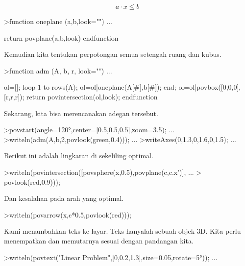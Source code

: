 \documentclass[12pt,arial,letterpaper]{book}
\begin{document}
\begin{eulercomment}
\begin{eulercomment}
\begin{eulercomment}
\begin{eulercomment}
\begin{eulercomment}
\begin{eulercomment}
\begin{eulercomment}
\begin{eulercomment}
\begin{eulercomment}
\begin{eulercomment}
\begin{eulercomment}
\begin{eulercomment}
\begin{eulercomment}
\begin{eulercomment}
\begin{eulercomment}
\begin{eulercomment}
\begin{eulercomment}
\begin{eulercomment}
\begin{eulercomment}
\end{eulercomment}
\begin{eulerformula}
\[
a \cdot x \le b
\]
\end{eulerformula}
\begin{eulerprompt}
>function oneplane (a,b,look="") ...
\end{eulerprompt}
\begin{eulerudf}
    return povplane(a,b,look)
  endfunction
\end{eulerudf}
\begin{eulercomment}
Kemudian kita tentukan perpotongan semua setengah ruang dan kubus.
\end{eulercomment}
\begin{eulerprompt}
>function adm (A, b, r, look="") ...
\end{eulerprompt}
\begin{eulerudf}
    ol=[];
    loop 1 to rows(A); ol=ol|oneplane(A[#],b[#]); end;
    ol=ol|povbox([0,0,0],[r,r,r]);
    return povintersection(ol,look);
  endfunction
\end{eulerudf}
\begin{eulercomment}
Sekarang, kita bisa merencanakan adegan tersebut.
\end{eulercomment}
\begin{eulerprompt}
>povstart(angle=120°,center=[0.5,0.5,0.5],zoom=3.5); ...
>writeln(adm(A,b,2,povlook(green,0.4))); ...
>writeAxes(0,1.3,0,1.6,0,1.5); ...
\end{eulerprompt}
\begin{eulercomment}
Berikut ini adalah lingkaran di sekeliling optimal.
\end{eulercomment}
\begin{eulerprompt}
>writeln(povintersection([povsphere(x,0.5),povplane(c,c.x')], ...
>  povlook(red,0.9)));
\end{eulerprompt}
\begin{eulercomment}
Dan kesalahan pada arah yang optimal.
\end{eulercomment}
\begin{eulerprompt}
>writeln(povarrow(x,c*0.5,povlook(red)));
\end{eulerprompt}
\begin{eulercomment}
Kami menambahkan teks ke layar. Teks hanyalah sebuah objek 3D. Kita
perlu menempatkan dan memutarnya sesuai dengan pandangan kita.
\end{eulercomment}
\begin{eulerprompt}
>writeln(povtext("Linear Problem",[0,0.2,1.3],size=0.05,rotate=5°)); ...

\end{eulerprompt}
\end{eulercomment}
\end{eulercomment}
\end{eulercomment}
\end{eulercomment}
\end{eulercomment}
\end{eulercomment}
\end{eulercomment}
\end{eulercomment}
\end{eulercomment}
\end{eulercomment}
\end{eulercomment}
\end{eulercomment}
\end{eulercomment}
\end{eulercomment}
\end{eulercomment}
\end{eulercomment}
\end{eulercomment}
\end{eulercomment}
\end{document}
